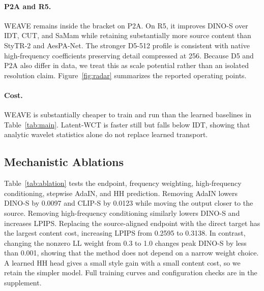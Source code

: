 \documentclass[letterpaper]{article}
\begin{document}
\paragraph{P2A and R5.}
WEAVE remains inside the bracket on P2A. On R5, it improves DINO-S over IDT, CUT, and
SaMam while retaining substantially more source content than StyTR-2 and AesPA-Net. The stronger D5-512 profile is
consistent with native high-frequency coefficients preserving detail compressed at 256.
Because D5 and P2A also differ in data, we treat this as scale potential rather than an
isolated resolution claim. Figure~\ref{fig:radar} summarizes the reported operating points.

\paragraph{Cost.}
WEAVE is substantially cheaper to train and run than the learned baselines in
Table~\ref{tab:main}. Latent-WCT is faster still but falls below IDT, showing that analytic
wavelet statistics alone do not replace learned transport.

\subsection{Mechanistic Ablations}
\label{sec:ablation}

Table~\ref{tab:ablation} tests the endpoint, frequency weighting, high-frequency
conditioning, stepwise AdaIN, and HH prediction. Removing AdaIN lowers DINO-S by 0.0097
and CLIP-S by 0.0123 while moving the output closer to the source. Removing high-frequency
conditioning similarly lowers DINO-S and increases LPIPS. Replacing the source-aligned
endpoint with the direct target has the largest content cost, increasing LPIPS from 0.2595
to 0.3138. In contrast, changing the nonzero LL weight from 0.3 to 1.0 changes peak DINO-S
by less than 0.001, showing that the method does not depend on a narrow weight choice. A
learned HH head gives a small style gain with a small content cost, so we retain the simpler
model. Full training curves and configuration checks are in the supplement.
\end{document}
